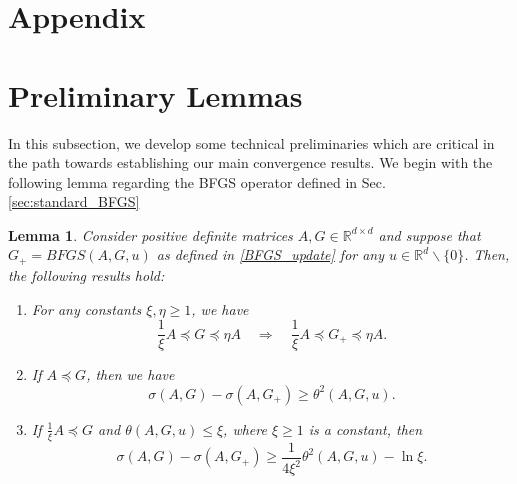 \documentclass[11pt]{article}
\numberwithin{assumption}{section}
\numberwithin{remark}{section}
\numberwithin{theorem}{section}
\newtheorem{lemma}[theorem]{Lemma}
\begin{document}
\appendix
\section*{Appendix}

\section{Preliminary Lemmas}
In this subsection, we develop some technical preliminaries which are critical in the path towards establishing our main convergence results. We begin with the following lemma regarding the BFGS operator defined in Sec. \ref{sec:standard_BFGS} 
\begin{lemma}\label{lemma_1}
Consider positive definite matrices $A, G \in \mathbb{R}^{d \times d}$ and suppose that $G_{+} = BFGS(A, G, u)$ as defined in \eqref{BFGS_update} for any $u \in \mathbb{R}^d\backslash\{0\}$. Then, the following results hold:

\begin{enumerate}

    \item
    For any constants $\xi, \eta \geq 1$, we have
    \begin{equation}\label{lemma_1_1}
        \frac{1}{\xi}A \preceq G \preceq \eta A \quad \Rightarrow \quad \frac{1}{\xi}A \preceq G_{+} \preceq \eta A.
    \end{equation}
    
    \item
    If $A \preceq G$, then we have
    \begin{equation}\label{lemma_1_2}
        \sigma(A, G) - \sigma(A, G_+) \geq \theta^2(A,G,u).
    \end{equation}

    \item
    If $\frac{1}{\xi}A \preceq G$  and $ \theta(A, G, u) \leq \xi$, where $\xi \geq 1$ is a constant, then
    \begin{equation}\label{lemma_1_3}
        \sigma(A, G) - \sigma(A, G_+) \geq \frac{1}{4\xi^2}\theta^2(A, G, u) - \ln{\xi}.
    \end{equation}
    
\end{enumerate}

\end{lemma}
\end{document}
